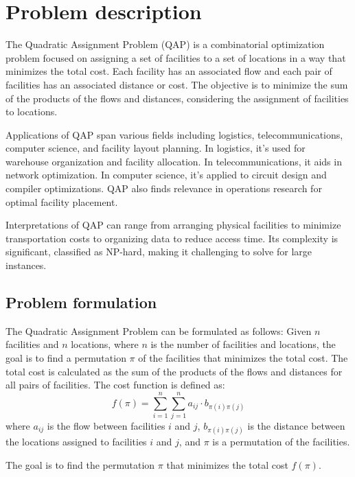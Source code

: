 \documentclass{article}
\begin{document}


\section{Problem description}\label{sec:problem-description}
The Quadratic Assignment Problem (QAP) is a combinatorial optimization problem focused on assigning a set of facilities to a set of locations
in a way that minimizes the total cost.
Each facility has an associated flow and each pair of facilities has an associated distance or cost.
The objective is to minimize the sum of the products of the flows and distances, considering the assignment of facilities to locations.

Applications of QAP span various fields including logistics, telecommunications, computer science, and facility layout planning.
In logistics, it's used for warehouse organization and facility allocation.
In telecommunications, it aids in network optimization.
In computer science, it's applied to circuit design and compiler optimizations.
QAP also finds relevance in operations research for optimal facility placement.

Interpretations of QAP can range from arranging physical facilities to minimize transportation costs to organizing data to reduce access time.
Its complexity is significant, classified as NP-hard, making it challenging to solve for large instances.

\subsection{Problem formulation}\label{subsec:problem-formulation}
The Quadratic Assignment Problem can be formulated as follows:
Given $n$ facilities and $n$ locations, where $n$ is the number of facilities and locations,
the goal is to find a permutation $\pi$ of the facilities that minimizes the total cost.
The total cost is calculated as the sum of the products of the flows and distances for all pairs of facilities.
The cost function is defined as:
\[ f(\pi) = \sum_{i=1}^{n} \sum_{j=1}^{n} a_{ij} \cdot b_{\pi(i)\pi(j)} \]
where $a_{ij}$ is the flow between facilities $i$ and $j$, $b_{\pi(i)\pi(j)}$ is the distance between the locations assigned to facilities $i$ and $j$,
and $\pi$ is a permutation of the facilities.

The goal is to find the permutation $\pi$ that minimizes the total cost $f(\pi)$.
\end{document}
